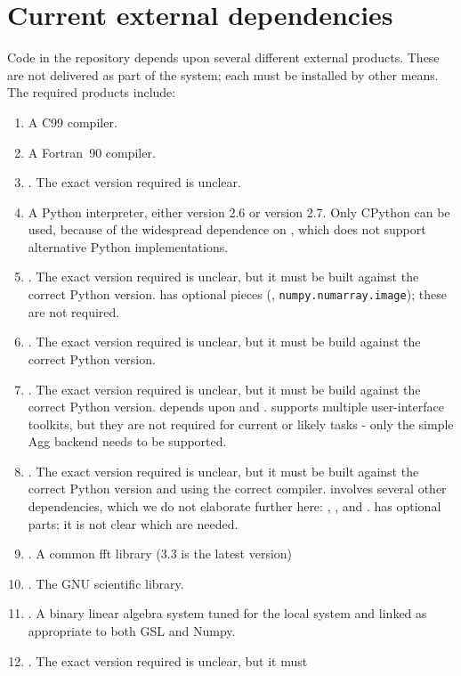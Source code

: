 \documentclass[draftmode,draftwater]{memarticle}
\newcommand{\cosmosis}{\name{CosmoSIS}\xspace}
\newcommand{\despipe}{\name{des-pipe}\xspace}
\begin{document}
\section{Current external dependencies}

Code in the \despipe repository depends upon several different
external products. These are not delivered as part of the
\despipe system; each must be installed by other means. The
required products include:
\begin{enumerate}
\item A C99 compiler.
\item A Fortran~90 compiler.
\item {}. The exact version required is unclear.
\item A Python interpreter, either version 2.6 or version 2.7. Only
  CPython can be used, because of the widespread dependence on
  , which does not support alternative Python
  implementations.
\item {}. The exact version required is unclear, but it must
  be built against the correct Python version.  has optional
  pieces (\eg, \texttt{numpy.numarray.image}); these are not required.
\item {}. The exact version required is unclear, but it must
  be build against the correct Python version.
\item {}. The exact version required is unclear, but it
  must be build against the correct Python version. 
  depends upon  and .  supports
  multiple user-interface toolkits, but they are not required for current
  or likely \cosmosis tasks - only the simple Agg backend needs to be supported.
\item {}. The exact version required is unclear, but it must
  be built against the correct Python version and using the correct
  \cpp{} compiler.  involves several other dependencies,
  which we do not elaborate further here: ,
  , and .  has optional parts; it is
  not clear which are needed.
\item {}. A common fft library (3.3 is the latest version)
\item {}.  The GNU scientific library.
\item {}. A binary linear algebra system tuned for the local
  system and linked as appropriate to both GSL and Numpy.
\item {}. The exact version required is unclear, but it must

\end{enumerate}
\end{document}
